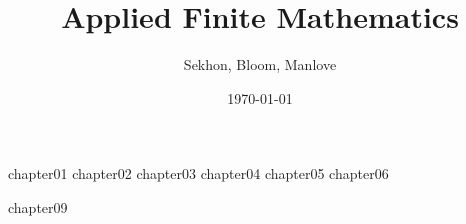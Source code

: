 \documentclass[12pt]{book}
\begin{document}

\frontmatter
\title{Applied Finite Mathematics}
\author{Sekhon, Bloom, Manlove}
\date{\today}
\maketitle
\tableofcontents

\mainmatter
{chapter01}
{chapter02}
{chapter03}
{chapter04}
{chapter05}
{chapter06}

{chapter09}


\backmatter
\end{document}
